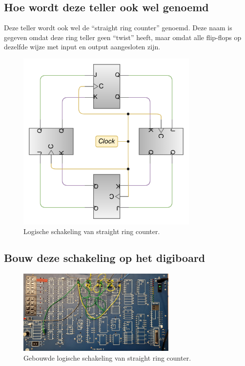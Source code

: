 \documentclass[12pt]{article}
\begin{document}
\subsection{Hoe wordt deze teller ook wel genoemd}
Deze teller wordt ook wel de ``straight ring counter'' genoemd. Deze naam is gegeven omdat deze ring teller geen ``twist'' heeft, maar omdat alle flip-flops op dezelfde wijze met input en output aangesloten zijn.
\begin{figure}[h]
    \centering
    \includegraphics[width=0.8\textwidth]{ringring.png}
    \caption{Logische schakeling van straight ring counter.}
    \label{fig:ringring}
\end{figure}
\pagebreak
\subsection{Bouw deze schakeling op het digiboard}
\begin{figure}[h]
    \centering
    \includegraphics[width=0.7\textwidth]{1ringstraight.jpg}
    \caption{Gebouwde logische schakeling van straight ring counter.}
    \label{fig:rs}
\end{figure} 
\end{document}
